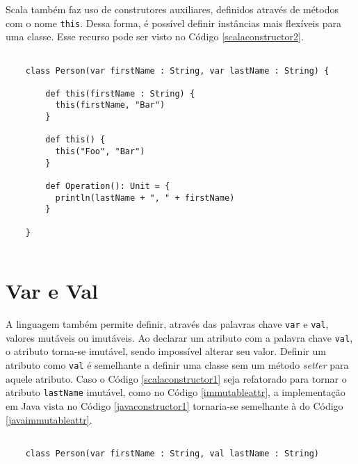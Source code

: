 Scala também faz uso de construtores auxiliares, definidos 
através de métodos com o nome \texttt{this}\cite{wampler2021}. 
Dessa forma, é possível 
definir instâncias mais flexíveis para uma classe. Esse 
recurso pode ser visto no Código \ref{scalaconstructor2}.

\begin{lstlisting}[caption={Construtor Auxiliar em Scala.},label=scalaconstructor2]

    class Person(var firstName : String, var lastName : String) {
       
        def this(firstName : String) {
          this(firstName, "Bar")
        }
    
        def this() {
          this("Foo", "Bar")
        }
      
        def Operation(): Unit = {
          println(lastName + ", " + firstName)
        }
  
    }
  
\end{lstlisting}


\section{Var e Val}

A linguagem também permite definir, através das 
palavras chave \texttt{var} e \texttt{val}, valores 
mutáveis ou imutáveis. Ao declarar um atributo com 
a palavra chave \texttt{val}, o atributo torna-se imutável, 
sendo impossível alterar seu valor.\cite{wampler2021, ordesky2008} 
Definir um atributo 
como \texttt{val} é semelhante a definir uma classe sem um 
método \textit{setter} para aquele atributo. Caso 
o Código \ref{scalaconstructor1} seja refatorado 
para tornar o atributo \texttt{lastName} imutável, como no Código 
\ref{immutableattr}, a implementação em Java vista no 
Código \ref{javaconstructor1} tornaria-se semelhante à do Código 
\ref{javaimmutableattr}.

\begin{lstlisting}[caption={Exemplo de Atributo Imutável.},label=immutableattr]

    class Person(var firstName : String, val lastName : String)

\end{lstlisting}

